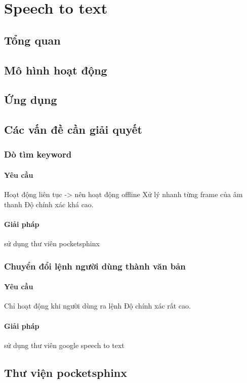 \chapter{Speech to text}
\ifpdf
    \graphicspath{{Chapter3/Chapter3Figs/PNG/}{Chapter3/Chapter3Figs/PDF/}{Chapter3/Chapter3Figs/}}
\else
    \graphicspath{{Chapter3/Chapter3Figs/EPS/}{Chapter3/Chapter3Figs/}}
\fi

\section{Tổng quan}
\section{Mô hình hoạt động}
\section{Ứng dụng}
\section{Các vấn đề cần giải quyết}
\subsection{Dò tìm keyword}
\subsubsection{Yêu cầu}
Hoạt động liên tục -> nên hoạt động offline
Xử lý nhanh từng frame của âm thanh
Độ chính xác khá cao.
\subsubsection{Giải pháp}
sử dụng thư viên pocketsphinx
\subsection{Chuyển đổi lệnh người dùng thành văn bản}
\subsubsection{Yêu cầu}
Chỉ hoạt động khi người dùng ra lệnh
Độ chính xác rất cao.
\subsubsection{Giải pháp}
sử dụng thư viên google speech to text
\section{Thư viện pocketsphinx}
